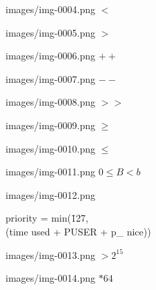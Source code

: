 \begin{plasTeXimage}{images/img-0004.png}
$<$
\end{plasTeXimage}

\begin{plasTeXimage}{images/img-0005.png}
$>$
\end{plasTeXimage}

\begin{plasTeXimage}{images/img-0006.png}
$++$
\end{plasTeXimage}

\begin{plasTeXimage}{images/img-0007.png}
$--$
\end{plasTeXimage}

\begin{plasTeXimage}{images/img-0008.png}
$>>$
\end{plasTeXimage}

\begin{plasTeXimage}{images/img-0009.png}
$\ge $
\end{plasTeXimage}

\begin{plasTeXimage}{images/img-0010.png}
$\le $
\end{plasTeXimage}

\begin{plasTeXimage}{images/img-0011.png}
$0 \le B < b$
\end{plasTeXimage}

\begin{plasTeXimage}{images/img-0012.png}
\begin{tabbing}  priority = min(\=  127,\\ \>  (time used + PUSER + p\_ nice))\\ \end{tabbing}
\end{plasTeXimage}

\begin{plasTeXimage}{images/img-0013.png}
$> 2^{15}$
\end{plasTeXimage}

\begin{plasTeXimage}{images/img-0014.png}
$* 64$
\end{plasTeXimage}

